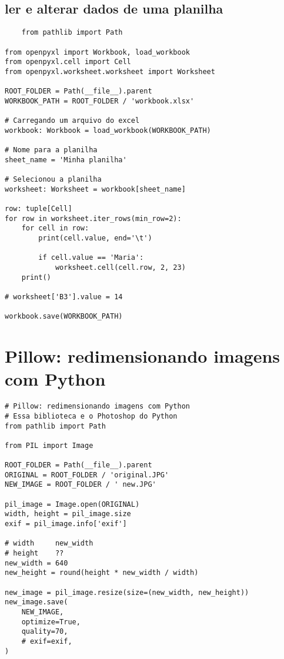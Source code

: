 \documentclass{article}
\begin{document}
\subsection{ler e alterar dados de uma planilha}
\begin{lstlisting}
    from pathlib import Path

from openpyxl import Workbook, load_workbook
from openpyxl.cell import Cell
from openpyxl.worksheet.worksheet import Worksheet

ROOT_FOLDER = Path(__file__).parent
WORKBOOK_PATH = ROOT_FOLDER / 'workbook.xlsx'

# Carregando um arquivo do excel
workbook: Workbook = load_workbook(WORKBOOK_PATH)

# Nome para a planilha
sheet_name = 'Minha planilha'

# Selecionou a planilha
worksheet: Worksheet = workbook[sheet_name]

row: tuple[Cell]
for row in worksheet.iter_rows(min_row=2):
    for cell in row:
        print(cell.value, end='\t')

        if cell.value == 'Maria':
            worksheet.cell(cell.row, 2, 23)
    print()

# worksheet['B3'].value = 14

workbook.save(WORKBOOK_PATH)

\end{lstlisting}

\section{Pillow: redimensionando imagens com Python}
\begin{lstlisting}
# Pillow: redimensionando imagens com Python
# Essa biblioteca e o Photoshop do Python
from pathlib import Path

from PIL import Image

ROOT_FOLDER = Path(__file__).parent
ORIGINAL = ROOT_FOLDER / 'original.JPG'
NEW_IMAGE = ROOT_FOLDER / ' new.JPG'

pil_image = Image.open(ORIGINAL)
width, height = pil_image.size
exif = pil_image.info['exif']

# width     new_width
# height    ??
new_width = 640
new_height = round(height * new_width / width)

new_image = pil_image.resize(size=(new_width, new_height))
new_image.save(
    NEW_IMAGE,
    optimize=True,
    quality=70,
    # exif=exif,
)
   

\end{lstlisting}
\end{document}

